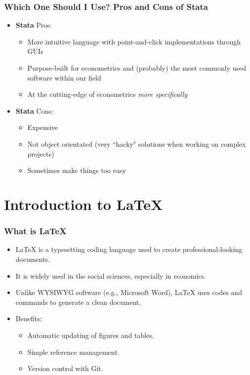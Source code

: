 \documentclass{beamer}
\begin{document}
\begin{frame}
    \frametitle{Which One Should I Use? Pros and Cons of Stata}

\begin{itemize}
    \item \textbf{Stata} Pros:
    \begin{itemize}
        \item More intuitive language with point-and-click implementations through GUIs
        \item Purpose-built for econometrics and (probably) the most commonly used software within our field
        \item At the cutting-edge of econometrics \emph{more specifically}
    \end{itemize}
    \item \textbf{Stata} Cons:
    \begin{itemize}
        \item Expensive
        \item Not object orientated (very ``hacky" solutions when working on complex projects)
        \item Sometimes make things too easy
    \end{itemize}
\end{itemize}

\end{frame}


\section{Introduction to \LaTeX}
\label{sec:latex}

\begin{frame}
    \frametitle{What is \LaTeX{}}

    \begin{itemize}
        \item \LaTeX{} is a typesetting coding language used to create professional-looking documents.
        \item It is widely used in the social sciences, especially in economics.
        \item Unlike WYSIWYG software (e.g., Microsoft Word), \LaTeX{} uses codes and commands to generate a clean document.
        \item Benefits:
        \begin{itemize}
            \item Automatic updating of figures and tables.
            \item Simple reference management.
            \item Version control with Git.
        \end{itemize}
    \end{itemize}
    \end{frame}
    
\end{document}
